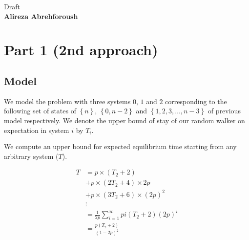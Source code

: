 \documentclass[]{book}
\theoremstyle{definition}
\begin{document}
\begin{center}
{\Large Draft}\\
\textbf{Alireza Abrehforoush}\\ %
\end{center}
\vspace{0.2 cm}


\section{Part 1 (2nd\hspace{0.1cm} approach)}
\subsection{Model}
We model the problem with three systems $0$, $1$ and $2$ corresponding to the following set of states of $\left\{ n \right\}$, $\left\{0, n-2\right\}$ and $\left\{1,2,3,\hdots,n-3\right\}$ of previous model respectively. We denote the upper bound of stay of our random walker on expectation in system $i$ by $T_{i}$. 

\begin{center}
\end{center}

We compute an upper bound for expected equilibrium time starting from any arbitrary system ($T$).

\begin{equation}\label{}
\begin{split}
    T &= p\times \left(T_{2} + 2\right) \\
      &+ p\times \left(2T_{2} + 4\right)\times 2p \\
      &+ p\times \left(3T_{2} + 6\right)\times \left(2p\right)^2 \\
      & \vdots \\
      &= \frac{1}{2p} \sum_{i=1}^{\infty} p i \left(T_{2} + 2\right)\left(2p\right)^i \\
      &= \frac{p\left(T_{2} + 2\right)}{\left(1-2p\right)^2}
\end{split}
\end{equation}
\end{document}

